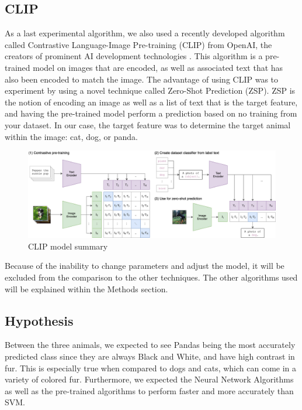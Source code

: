 \subsection{CLIP}
As a last experimental algorithm, we also used a recently developed algorithm called Contrastive Language-Image Pre-training (CLIP) from OpenAI, the creators of prominent AI development technologies \cite{CLIP}.
This algorithm is a pre-trained model on images that are encoded, as well as associated text that has also been encoded to match the image.
The advantage of using CLIP was to experiment by using a novel technique called Zero-Shot Prediction (ZSP).
ZSP is the notion of encoding an image as well as a list of text that is the target feature, and having the pre-trained model perform a prediction based on no training from your dataset.
In our case, the target feature was to determine the target animal within the image: cat, dog, or panda.

\begin{figure}[h]
	\centering
	\includegraphics[scale=0.5]{CLIP_structure}
	\caption{CLIP model summary}
	\label{fig:figure3}
\end{figure}

Because of the inability to change parameters and adjust the model, it will be excluded from the comparison to the other techniques.
The other algorithms used will be explained within the Methods section.

\subsection{Hypothesis}
Between the three animals, we expected to see Pandas being the most accurately predicted class since they are always Black and White, and have high contrast in fur.
This is especially true when compared to dogs and cats, which can come in a variety of colored fur.
Furthermore, we expected the Neural Network Algorithms as well as the pre-trained algorithms to perform faster and more accurately than SVM.